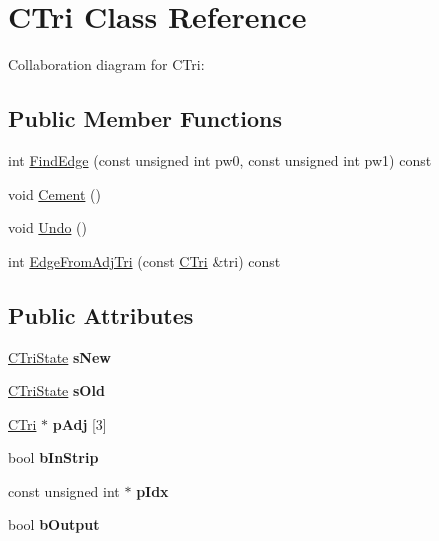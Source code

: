 \hypertarget{class_c_tri}{\section{C\+Tri Class Reference}
\label{class_c_tri}
}


Collaboration diagram for C\+Tri\+:
\subsection*{Public Member Functions}
\begin{DoxyCompactItemize}
\item 
int \hyperlink{class_c_tri_a3c5497d43d2507d9d8c9d1d81b1badd7}{Find\+Edge} (const unsigned int pw0, const unsigned int pw1) const 
\item 
void \hyperlink{class_c_tri_a81cf9e059f724080845d2a7a1cf34455}{Cement} ()
\item 
void \hyperlink{class_c_tri_a63141b5c4b07ae602d5b21cdf9e11d03}{Undo} ()
\item 
int \hyperlink{class_c_tri_a85d6603e71c559770222fe69798af1f5}{Edge\+From\+Adj\+Tri} (const \hyperlink{class_c_tri}{C\+Tri} \&tri) const 
\end{DoxyCompactItemize}
\subsection*{Public Attributes}
\begin{DoxyCompactItemize}
\item 
\hypertarget{class_c_tri_a53c4f3685f3ba94bcaf4e51870c5d5d7}{\hyperlink{class_c_tri_state}{C\+Tri\+State} {\bfseries s\+New}}\label{class_c_tri_a53c4f3685f3ba94bcaf4e51870c5d5d7}

\item 
\hypertarget{class_c_tri_acfabb620de8a0e82fbed2bfb20085f78}{\hyperlink{class_c_tri_state}{C\+Tri\+State} {\bfseries s\+Old}}\label{class_c_tri_acfabb620de8a0e82fbed2bfb20085f78}

\item 
\hypertarget{class_c_tri_a2721615491345a3d3a54f62cfbe2ab6b}{\hyperlink{class_c_tri}{C\+Tri} $\ast$ {\bfseries p\+Adj} \mbox{[}3\mbox{]}}\label{class_c_tri_a2721615491345a3d3a54f62cfbe2ab6b}

\item 
\hypertarget{class_c_tri_a779a262826294980bee9cb57fe7837ab}{bool {\bfseries b\+In\+Strip}}\label{class_c_tri_a779a262826294980bee9cb57fe7837ab}

\item 
\hypertarget{class_c_tri_ab844c4af9196960ada596a36bb161728}{const unsigned int $\ast$ {\bfseries p\+Idx}}\label{class_c_tri_ab844c4af9196960ada596a36bb161728}

\item 
\hypertarget{class_c_tri_a68315bb3c1f3746d235c654585bfed9f}{bool {\bfseries b\+Output}}\label{class_c_tri_a68315bb3c1f3746d235c654585bfed9f}

\end{DoxyCompactItemize}


